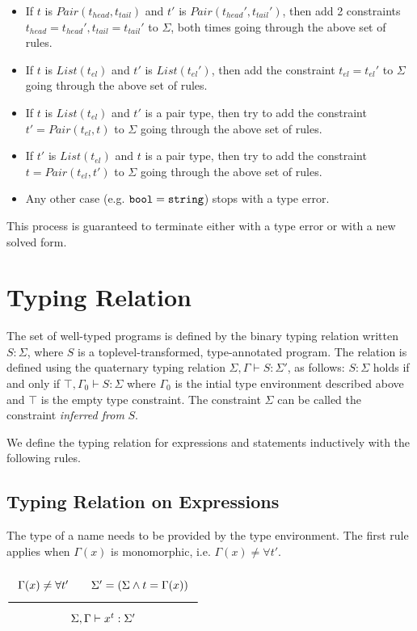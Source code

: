 \begin{itemize}
\item If $t$ is $Pair(t_{head},t_{tail})$ and
  $t'$ is $Pair(t_{head} ',t_{tail} ')$, then add 2 constraints
  $t_{head} = t_{head} ', t_{tail} = t_{tail} '$ to $\Sigma$, both times going through the above set of rules.
\item If $t$ is $List(t_{el})$ and
  $t'$ is $List(t_{el} ')$, then add the constraint
  $t_{el} = t_{el} '$ to $\Sigma$ going through the above set of rules.
\item If $t$ is $List(t_{el})$ and
$t'$ is a pair type, then try to add the constraint $t' = Pair(t_{el}, t)$ to $\Sigma$ going through the above set of rules.
\item If $t'$ is $List(t_{el})$ and
$t$ is a pair type, then try to add the constraint $t = Pair(t_{el}, t')$ to $\Sigma$ going through the above set of rules.
\item Any other case  (e.g. $\texttt{bool} = \texttt{string}$) stops with a type error.
\end{itemize}
This process is guaranteed to terminate either with a type error or with a new solved form.

\section{Typing Relation}

The set of well-typed programs is defined by the binary typing relation
written $S: \Sigma$, where $S$ is a toplevel-transformed, type-annotated program.
The relation is defined using the quaternary typing relation
$\Sigma, \Gamma \vdash S : \Sigma'$, as follows:
$S: \Sigma$ holds if and only if 
$\top, \Gamma_0 \vdash S : \Sigma$
where $\Gamma_0$ is the intial type environment described above and $\top$ is the empty
type constraint. The constraint $\Sigma$ can be called the constraint \emph{inferred from}
$S$. 

We define the typing relation for expressions and statements
inductively with the following rules.

\subsection{Typing Relation on Expressions}

The type of a name needs to be provided by the type environment. The first rule
applies when $\Gamma(x)$ is monomorphic, i.e. $\Gamma(x) \neq \forall t'$.

\noindent
$\Rule{\Gamma(x) \neq \forall t' \qquad
  \Sigma' = (\Sigma \wedge t = \Gamma(x))}{\Sigma, \Gamma \vdash x^t : \Sigma'}$

